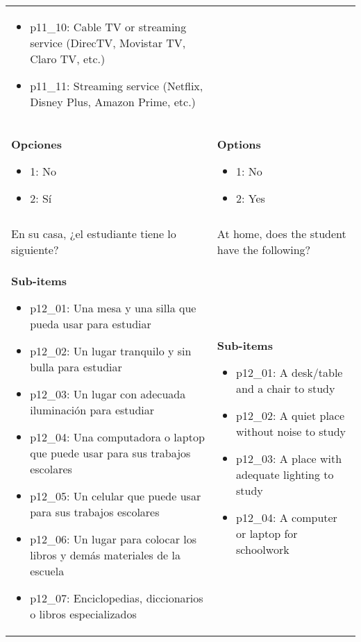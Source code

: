 \documentclass[11pt]{article}
\begin{document}
\begin{longtable}{@{}LL@{}}
\begin{itemize}[leftmargin=*]
\item p11\_10: Cable TV or streaming service (DirecTV, Movistar TV, Claro TV, etc.)
\item p11\_11: Streaming service (Netflix, Disney Plus, Amazon Prime, etc.)\end{itemize} \\
\textbf{Opciones}\par\begin{itemize}[leftmargin=*]\item 1: No
\item 2: Sí\end{itemize} & \textbf{Options}\par\begin{itemize}[leftmargin=*]\item 1: No
\item 2: Yes\end{itemize} \\
\addlinespace[4pt]
 \\ 
En su casa, ¿el estudiante tiene lo siguiente? & At home, does the student have the following? \\
\textbf{Sub-items}\par\begin{itemize}[leftmargin=*]\item p12\_01: Una mesa y una silla que pueda usar para estudiar
\item p12\_02: Un lugar tranquilo y sin bulla para estudiar
\item p12\_03: Un lugar con adecuada iluminación para estudiar
\item p12\_04: Una computadora o laptop que puede usar para sus trabajos escolares
\item p12\_05: Un celular que puede usar para sus trabajos escolares
\item p12\_06: Un lugar para colocar los libros y demás materiales de la escuela
\item p12\_07: Enciclopedias, diccionarios o libros especializados\end{itemize} & \textbf{Sub-items}\par\begin{itemize}[leftmargin=*]\item p12\_01: A desk/table and a chair to study
\item p12\_02: A quiet place without noise to study
\item p12\_03: A place with adequate lighting to study
\item p12\_04: A computer or laptop for schoolwork

\end{itemize}
\end{longtable}
\end{document}
